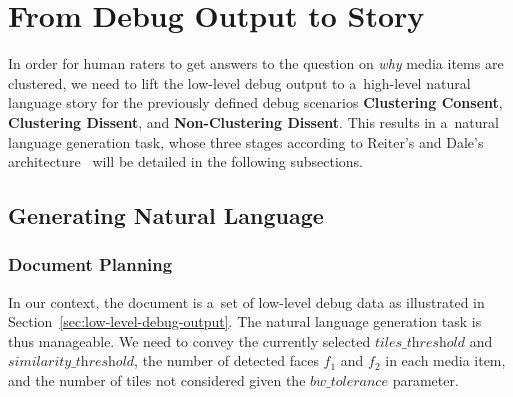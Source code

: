 \documentclass{article}
\begin{document}

\section{From Debug Output to Story}
\label{sec:from-debug-output-to-story}
In order for human raters to get answers to the question on \emph{why} media items are clustered, we need to lift the low-level debug output to a~high-level natural language story for the previously defined debug scenarios \textbf{Clustering Consent}, \textbf{Clustering Dissent}, and \textbf{Non-Clustering Dissent}. This results in a~natural language generation task, whose three stages according to Reiter's and Dale's architecture~\cite{reiter2000building} will be detailed in the following subsections.

\subsection{Generating Natural Language}

\subsubsection{Document Planning}
In our context, the document is a~set of low-level debug data as illustrated in Section~\ref{sec:low-level-debug-output}. The natural language generation task is thus manageable. We need to convey the currently selected $\textit{tiles\_threshold}$ and $\textit{similarity\_threshold}$, the number of detected faces $f_1$ and $f_2$ in each media item, and the number of tiles not considered given the $\textit{bw\_tolerance}$ parameter.
\end{document}
